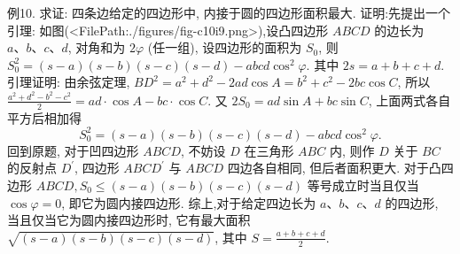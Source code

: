 例10. 求证: 四条边给定的四边形中, 内接于圆的四边形面积最大.
证明:先提出一个引理: 如图(<FilePath:./figures/fig-c10i9.png>),设凸四边形 $A B C D$ 的边长为 $a 、 b 、 c 、 d$, 对角和为 $2 \varphi$ (任一组), 设四边形的面积为 $S_0$, 则 $S_0^2=(s-a)(s-b)(s-c)(s-d)- a b c d \cos ^2 \varphi$. 其中 $2 s=a+b+c+d$.
引理证明: 由余弦定理, $B D^2=a^2+d^2-2 a d \cos A= b^2+c^2-2 b c \cos C$, 所以 $\frac{a^2+d^2-b^2-c^2}{2}=a d \cdot \cos A- b c \cdot \cos C$.
又 $2 S_0=a d \sin A+b c \sin C$, 上面两式各自平方后相加得
$$
S_0^2=(s-a)(s-b)(s-c)(s-d)-a b c d \cos ^2 \varphi .
$$
回到原题, 对于凹四边形 $A B C D$, 不妨设 $D$ 在三角形 $A B C$ 内, 则作 $D$ 关于 $B C$ 的反射点 $D^{\prime}$, 四边形 $A B C D^{\prime}$ 与 $A B C D$ 四边各自相同, 但后者面积更大.
对于凸四边形 $A B C D, S_0 \leqslant(s-a)(s-b)(s-c)(s-d)$ 等号成立时当且仅当 $\cos \varphi=0$, 即它为圆内接四边形.
综上,对于给定四边长为 $a 、 b 、 c 、 d$ 的四边形, 当且仅当它为圆内接四边形时, 它有最大面积 $\sqrt{(s-a)(s-b)(s-c)(s-d)}$, 其中 $S= \frac{a+b+c+d}{2}$.


